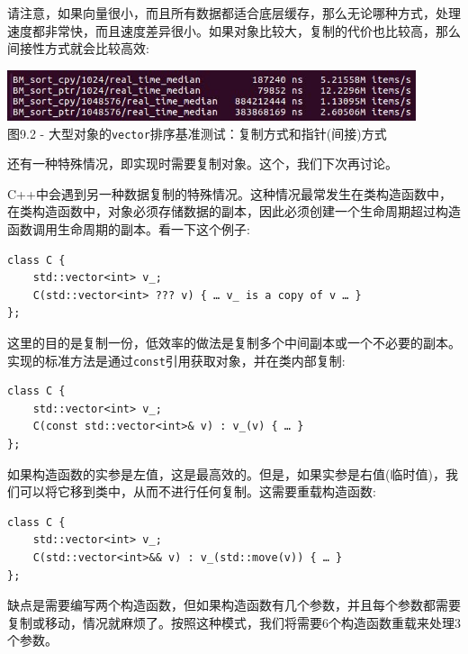 请注意，如果向量很小，而且所有数据都适合底层缓存，那么无论哪种方式，处理速度都非常快，而且速度差异很小。如果对象比较大，复制的代价也比较高，那么间接性方式就会比较高效:

\begin{center}
\includegraphics[width=0.9\textwidth]{content/3/chapter9/images/2.jpg}\\
图9.2 - 大型对象的\texttt{vector}排序基准测试：复制方式和指针(间接)方式
\end{center}

还有一种特殊情况，即实现时需要复制对象。这个，我们下次再讨论。


C++中会遇到另一种数据复制的特殊情况。这种情况最常发生在类构造函数中，在类构造函数中，对象必须存储数据的副本，因此必须创建一个生命周期超过构造函数调用生命周期的副本。看一下这个例子:

\begin{lstlisting}[style=styleCXX]
class C {
	std::vector<int> v_;
	C(std::vector<int> ??? v) { … v_ is a copy of v … }
};
\end{lstlisting}

这里的目的是复制一份，低效率的做法是复制多个中间副本或一个不必要的副本。实现的标准方法是通过\texttt{const}引用获取对象，并在类内部复制:

\begin{lstlisting}[style=styleCXX]
class C {
	std::vector<int> v_;
	C(const std::vector<int>& v) : v_(v) { … }
};
\end{lstlisting}

如果构造函数的实参是左值，这是最高效的。但是，如果实参是右值(临时值)，我们可以将它移到类中，从而不进行任何复制。这需要重载构造函数:

\begin{lstlisting}[style=styleCXX]
class C {
	std::vector<int> v_;
	C(std::vector<int>&& v) : v_(std::move(v)) { … }
};
\end{lstlisting}

缺点是需要编写两个构造函数，但如果构造函数有几个参数，并且每个参数都需要复制或移动，情况就麻烦了。按照这种模式，我们将需要6个构造函数重载来处理3个参数。

